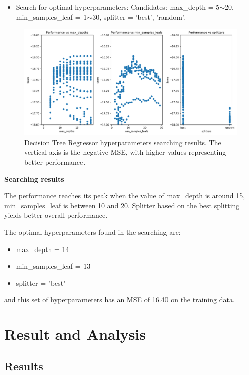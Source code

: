 \documentclass[a4paper]{article}
\begin{document}
\begin{itemize}
    \item Search for optimal hyperparameters: Candidates: max\_depth = 5$\sim$20, min\_samples\_leaf = 1$\sim$30, splitter = 'best', 'random'. 
\end{itemize}

\begin{figure}[htbp]
    \centering
    \includegraphics[width = 0.8\linewidth]{Pics/DTR_training.png}
    \caption{Decision Tree Regressor hyperparameters searching results. The vertical axis is the negative MSE, with higher values representing better performance.}
    \label{fig:DTR_training}
\end{figure}

\textbf{Searching results}

The performance reaches its peak when the value of max\_depth is around 15, min\_samples\_leaf is between 10 and 20. Splitter based on the best splitting yields better overall performance.

The optimal hyperparameters found in the searching are: 

\begin{itemize}
    \item max\_depth = 14
    \item min\_samples\_leaf = 13
    \item splitter = "best"
\end{itemize}

and this set of hyperparameters has an MSE of 16.40 on the training data. 

\section{Result and Analysis}

\subsection{Results}
\end{document}
